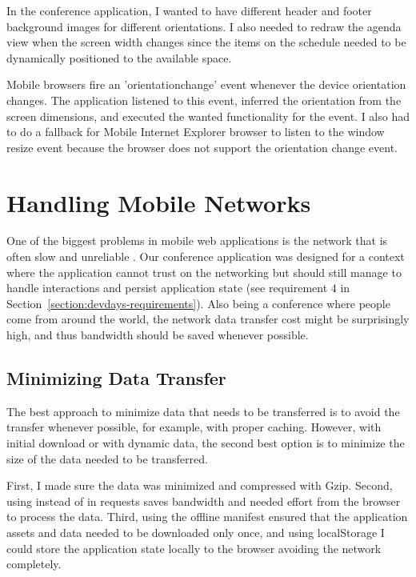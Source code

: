 In the conference application, I wanted to have different header and
footer background images for different orientations. I also needed to
redraw the agenda view when the screen width changes since the items
on the schedule needed to be dynamically positioned to the available
space.

Mobile browsers fire an 'orientationchange' event whenever the device
orientation changes. The application listened to this event, inferred
the orientation from the screen dimensions, and executed the wanted
functionality for the event. I also had to do a fallback for Mobile
Internet Explorer browser to listen to the window resize event because
the browser does not support the orientation change event.

\section{Handling Mobile Networks}
\label{section:handling-networks}

One of the biggest problems in mobile web applications is the network
that is often slow and unreliable \cite{zandy2002reliable}. Our
conference application was designed for a context where the
application cannot trust on the networking but should still manage to
handle interactions and persist application state (see requirement 4
in Section~\ref{section:devdays-requirements}). Also being a
conference where people come from around the world, the network data
transfer cost might be surprisingly high, and thus bandwidth should be
saved whenever possible.

\subsection{Minimizing Data Transfer}

The best approach to minimize data that needs to be transferred is to
avoid the transfer whenever possible, for example, with proper
caching. However, with initial download or with dynamic data, the
second best option is to minimize the size of the data needed to be
transferred.

First, I made sure the data was minimized and compressed with
Gzip. Second, using  instead of  in 
requests saves bandwidth \cite{charland2011mobile} and needed effort
from the browser to process the data. Third, using the offline
manifest ensured that the application assets and data needed to be
downloaded only once, and using localStorage I could store the
application state locally to the browser avoiding the network
completely.

